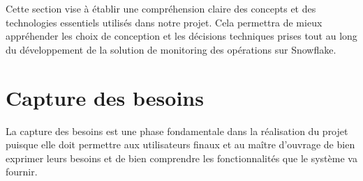     Cette section vise à établir une compréhension claire des concepts et des technologies essentiels utilisés dans notre projet. Cela permettra de mieux appréhender les choix de conception et les décisions techniques prises tout au long du développement de la solution de monitoring des opérations sur Snowflake.
    
\section{Capture des besoins}
\par La capture des besoins est une phase fondamentale dans la réalisation du projet puisque elle doit
permettre aux utilisateurs finaux et au maître d'ouvrage de bien exprimer leurs besoins et de bien
comprendre les fonctionnalités que le système va fournir.
